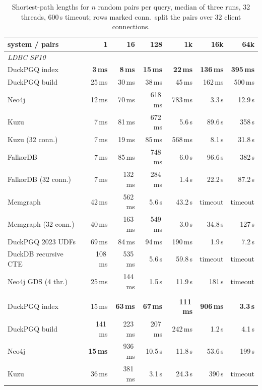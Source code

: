 \begin{table}[t]\centering\scriptsize\setlength{\tabcolsep}{2.6pt}
\caption{Shortest-path lengths for $n$ random pairs per query, median of three runs, 32 threads, 600\,s timeout; rows marked conn.\ split the pairs over 32 client connections.}\label{tab:random-pairs}
\begin{tabular}{lrrrrrr}\toprule
system / pairs & 1 & 16 & 128 & 1k & 16k & 64k \\ \midrule
\multicolumn{7}{l}{\textit{LDBC SF10}} \\
\quad DuckPGQ index & \textbf{3\,ms} & \textbf{8\,ms} & \textbf{15\,ms} & \textbf{22\,ms} & \textbf{136\,ms} & \textbf{395\,ms} \\
\quad DuckPGQ build & 25\,ms & 30\,ms & 38\,ms & 45\,ms & 162\,ms & 500\,ms \\
\quad Neo4j & 12\,ms & 70\,ms & 618\,ms & 783\,ms & 3.3\,s & 12.9\,s \\
\quad Kuzu & 7\,ms & 81\,ms & 672\,ms & 5.6\,s & 89.6\,s & 358\,s \\
\quad Kuzu (32 conn.) & 7\,ms & 19\,ms & 85\,ms & 568\,ms & 8.1\,s & 31.8\,s \\
\quad FalkorDB & 7\,ms & 85\,ms & 748\,ms & 6.0\,s & 96.6\,s & 382\,s \\
\quad FalkorDB (32 conn.) & 7\,ms & 132\,ms & 284\,ms & 1.4\,s & 22.2\,s & 87.2\,s \\
\quad Memgraph & 42\,ms & 562\,ms & 5.6\,s & 43.2\,s & timeout & timeout \\
\quad Memgraph (32 conn.) & 40\,ms & 163\,ms & 549\,ms & 3.0\,s & 34.8\,s & 127\,s \\
\quad DuckPGQ 2023 UDFs & 69\,ms & 84\,ms & 94\,ms & 190\,ms & 1.9\,s & 7.2\,s \\
\quad DuckDB recursive CTE & 108\,ms & 535\,ms & 5.6\,s & 59.8\,s & timeout & timeout \\
\quad Neo4j GDS (4 thr.) & 25\,ms & 144\,ms & 1.5\,s & 11.9\,s & 181\,s & timeout \\
\addlinespace
\multicolumn{7}{l}{\textit{LDBC SF100}} \\
\quad DuckPGQ index & 15\,ms & \textbf{63\,ms} & \textbf{67\,ms} & \textbf{111\,ms} & \textbf{906\,ms} & \textbf{3.3\,s} \\
\quad DuckPGQ build & 141\,ms & 223\,ms & 207\,ms & 242\,ms & 1.2\,s & 4.1\,s \\
\quad Neo4j & \textbf{15\,ms} & 936\,ms & 10.5\,s & 11.8\,s & 53.6\,s & 199\,s \\
\quad Kuzu & 36\,ms & 381\,ms & 3.1\,s & 24.3\,s & 390\,s & timeout \\

\end{tabular}
\end{table}
